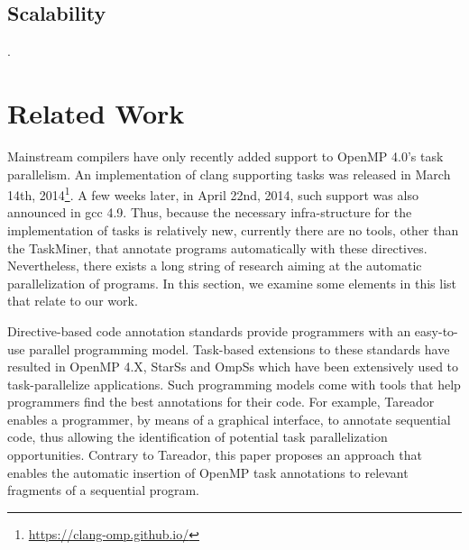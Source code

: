 \documentclass[sigplan,10pt,review,anonymous]{acmart}
\newcommand\Taskminer{\mbox{\textsf{TaskMiner}}}
\begin{document}
\subsection{Scalability}.

\section{Related Work}
\label{sec:rw}

Mainstream compilers have only recently added support to OpenMP 4.0's task
parallelism.
An implementation of \textsf{clang} supporting tasks was released in March 14th,
2014\footnote{\url{https://clang-omp.github.io/}}.
A few weeks later, in April 22nd, 2014, such support was also announced in
\textsf{gcc} 4.9.
Thus, because the necessary infra-structure for the implementation of tasks is
relatively new, currently there are no tools, other than the \Taskminer,
that annotate programs automatically with these directives.
Nevertheless, there exists a long string of research aiming at the automatic
parallelization of programs.
In this section, we examine some elements in this list that relate to our
work.

Directive-based code annotation standards provide programmers with an easy-to-use
parallel programming model.
Task-based extensions to these standards have resulted in OpenMP 4.X,
StarSs \cite{bellens:sc:2006, perez:iccc:2008, planas:hpca:2009,
tejedor:hpdc:2011} and OmpSs \cite{bueno:icpp:2011, duran:ppl:2011}  which have
been extensively used to task-parallelize applications. Such
programming models come with tools that help programmers find the
best annotations for their code. For example,  Tareador
\cite{ayguade:wcae:2015} enables a programmer, by means of a graphical interface,
to annotate sequential code, thus allowing the identification of potential task
parallelization opportunities.
Contrary to Tareador,  this paper proposes an approach that enables the
automatic insertion of OpenMP task annotations to relevant fragments of a
sequential program.
\end{document}
